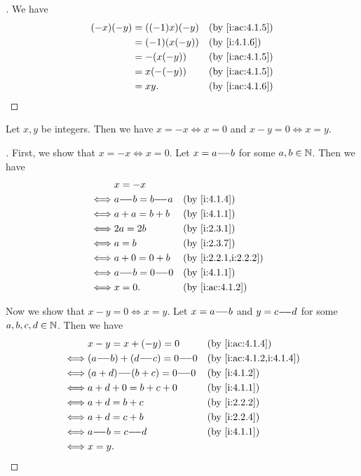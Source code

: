 \begin{proof}[]
  We have
  \begin{align*}
    (-x) (-y) & = ((-1) x) (-y) &  & \by{i:ac:4.1.5} \\
              & = (-1) (x (-y)) &  & \by{i:4.1.6}    \\
              & = -(x (-y))     &  & \by{i:ac:4.1.5} \\
              & = x (-(-y))     &  & \by{i:ac:4.1.5} \\
              & = xy.           &  & \by{i:ac:4.1.6}
  \end{align*}
\end{proof}

\begin{ac}\label{i:ac:4.1.8}
  Let \(x, y\) be integers.
  Then we have \(x = -x \iff x = 0\) and \(x - y = 0 \iff x = y\).
\end{ac}

\begin{proof}[]
  First, we show that \(x = -x \iff x = 0\).
  Let \(x = a {-}\!{-} b\) for some \(a, b \in \mathbb{N}\).
  Then we have
  \begin{align*}
         & x = -x                                      \\
    \iff & a \mm b = b \mm a &  & \by{i:4.1.4}         \\
    \iff & a + a = b + b     &  & \by{i:4.1.1}         \\
    \iff & 2a = 2b           &  & \by{i:2.3.1}         \\
    \iff & a = b             &  & \by{i:2.3.7}         \\
    \iff & a + 0 = 0 + b     &  & \by{i:2.2.1,i:2.2.2} \\
    \iff & a \mm b = 0 \mm 0 &  & \by{i:4.1.1}         \\
    \iff & x = 0.            &  & \by{i:ac:4.1.2}
  \end{align*}

  Now we show that \(x - y = 0 \iff x = y\).
  Let \(x = a {-}\!{-} b\) and \(y = c {-}\!{-} d\) for some \(a, b, c, d \in \mathbb{N}\).
  Then we have
  \begin{align*}
         & x - y = x + (-y) = 0            &  & \by{i:ac:4.1.4}         \\
    \iff & (a \mm b) + (d \mm c) = 0 \mm 0 &  & \by{i:ac:4.1.2,i:4.1.4} \\
    \iff & (a + d) \mm (b + c) = 0 \mm 0   &  & \by{i:4.1.2}            \\
    \iff & a + d + 0 = b + c + 0           &  & \by{i:4.1.1}            \\
    \iff & a + d = b + c                   &  & \by{i:2.2.2}            \\
    \iff & a + d = c + b                   &  & \by{i:2.2.4}            \\
    \iff & a \mm b = c \mm d               &  & \by{i:4.1.1}            \\
    \iff & x = y.
  \end{align*}
\end{proof}

